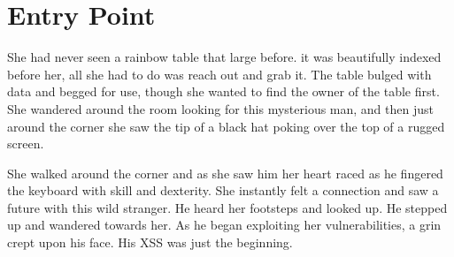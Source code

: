\chapter{Entry Point}

She had never seen a rainbow table that large before. it was beautifully
indexed before her, all she had to do was reach out and grab it. The table
bulged with data and begged for use, though she wanted to find the owner
of the table first. She wandered around the room looking for this
mysterious man, and then just around the corner she saw the tip of a black
hat poking over the top of a rugged screen.

She walked around the corner and as she saw him her heart raced as he
fingered the keyboard with skill and dexterity. She instantly felt a
connection and saw a future with this wild stranger. He heard her footsteps
and looked up. He stepped up and wandered towards her. As he began
exploiting her vulnerabilities, a grin crept upon his face. His XSS was
just the beginning.


